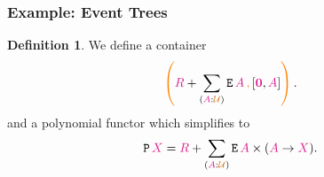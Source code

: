 \documentclass[xelatex,mathserif,serif,notheorems]{beamer} %
\theoremstyle{plain} %
\theoremstyle{definition}
\newtheorem{defn}[thm]{Definition}%
\theoremstyle{remark}
\newcommand*{\type}[1]{\textcolor{magenta!90!black}{#1}}
\newcommand*{\containerpair}[2]{\ensuremath{\colorlet{savedleftcolor}{.}\color{orange}\left(\color{savedleftcolor}#1\,\textcolor{orange}{\mathbf{,}}\,#2\color{orange}\right)\color{savedleftcolor}}}
\newcommand*{\universe}[1]{\textcolor{orange!80!black}{#1}}
\newcommand*{\empt}{\type{\textbf{0}}}
\newcommand*{\function}[1]{\textcolor{blue!60!black}{\ensuremath{\mathtt{#1}}}}
\newcommand*{\constructor}[1]{\textcolor{purple!60!black}{\ensuremath{\mathtt{#1}}}}
\newcommand*{\typeformer}[1]{\ensuremath{\mathtt{#1}}}
\newcommand*{\functor}[1]{\ensuremath{\mathbf{\mathtt{#1}}}}
\newcommand{\setlengths}{
  \setlength{\abovedisplayskip}{4pt}
  \setlength{\belowdisplayskip}{4pt}
  \setlength{\abovedisplayshortskip}{2pt}
  \setlength{\belowdisplayshortskip}{2pt}
}
\begin{document}
\begin{frame}[fragile]
  \frametitle{Example: Event Trees}
  \begin{defn}\setlengths
    We define a container
    \begin{equation}
      \containerpair{\type{R} + \sum_{(\type{A} : \universe{\mathcal{U}})} \typeformer{E}\,\type{A}}{[\empt, \type{A}]}.
    \end{equation}
    and a polynomial functor which simplifies to
    \begin{equation}
      \functor{P}\,\type{X} = \type{R} + \sum_{(\type{A} : \universe{\mathcal{U}})} \typeformer{E}\,\type{A} \times (\type{A} \rightarrow \type{X}).
    \end{equation}
  \end{defn}
  \begin{figure}[h]
    \centering
  \end{figure}
\end{frame}
\end{document}
